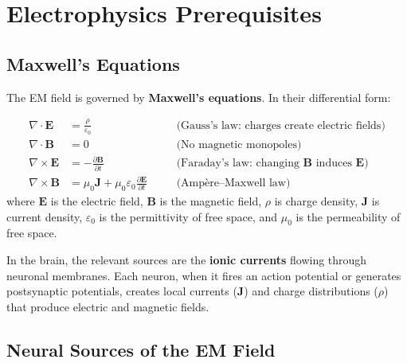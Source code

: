 \documentclass[11pt,a4paper]{report}
\begin{document}
\chapter{Electrophysics Prerequisites}

\section{Maxwell's Equations}

The EM field is governed by \textbf{Maxwell's equations}. In their differential form:

\begin{mathbox}
\vspace{-6pt}
\begin{align}
  \nabla \cdot \mathbf{E} &= \frac{\rho}{\varepsilon_0} \quad &&\text{(Gauss's law: charges create electric fields)} \label{eq:gauss}\\[4pt]
  \nabla \cdot \mathbf{B} &= 0 \quad &&\text{(No magnetic monopoles)} \label{eq:gauss_b}\\[4pt]
  \nabla \times \mathbf{E} &= -\frac{\partial \mathbf{B}}{\partial t} \quad &&\text{(Faraday's law: changing } \mathbf{B} \text{ induces } \mathbf{E}\text{)} \label{eq:faraday}\\[4pt]
  \nabla \times \mathbf{B} &= \mu_0 \mathbf{J} + \mu_0 \varepsilon_0 \frac{\partial \mathbf{E}}{\partial t} \quad &&\text{(Amp\`ere--Maxwell law)} \label{eq:ampere}
\end{align}
where $\mathbf{E}$ is the electric field, $\mathbf{B}$ is the magnetic field, $\rho$ is charge density, $\mathbf{J}$ is current density, $\varepsilon_0$ is the permittivity of free space, and $\mu_0$ is the permeability of free space.
\vspace{-4pt}
\end{mathbox}

In the brain, the relevant sources are the \textbf{ionic currents} flowing through neuronal membranes. Each neuron, when it fires an action potential or generates postsynaptic potentials, creates local currents ($\mathbf{J}$) and charge distributions ($\rho$) that produce electric and magnetic fields.

\section{Neural Sources of the EM Field}
\end{document}
